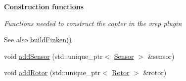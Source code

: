 \begin{Indent}{\bf Construction functions}\par
{\em Functions needed to construct the copter in the vrep plugin \begin{DoxySeeAlso}{See also}
\hyperlink{finken_8cpp_ab8920c514423348469521fe0063534c4}{build\+Finken()} 
\end{DoxySeeAlso}
}\begin{DoxyCompactItemize}
\item 
void \hyperlink{classFinken_a2f2adb211e80a689f580b87730aeb9d1}{add\+Sensor} (std\+::unique\+\_\+ptr$<$ \hyperlink{classSensor}{Sensor} $>$ \&sensor)
\item 
void \hyperlink{classFinken_a4ac9d9b37fba41147a83a36286fbe91b}{add\+Rotor} (std\+::unique\+\_\+ptr$<$ \hyperlink{classRotor}{Rotor} $>$ \&rotor)
\end{DoxyCompactItemize}
\end{Indent}
